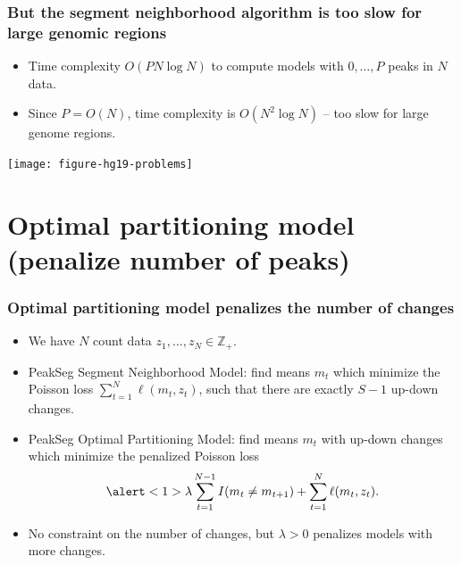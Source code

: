 \documentclass{beamer}
\newcommand{\ZZ}{\mathbb Z}
\begin{document}
\begin{frame}
  \frametitle{But the segment neighborhood algorithm is too slow for
    large genomic regions}
  \begin{itemize}
  \item Time complexity $O(P N \log N)$ to compute models with
    $0,\dots,P$ peaks in $N$ data.
  \item Since $P=O(N)$, time complexity is $O(N^2 \log N)$ -- too slow
    for large genome regions.
  \end{itemize}
  \texttt{[image: figure-hg19-problems]}
\end{frame}

\section{Optimal partitioning model (penalize number of peaks)}

\begin{frame}
  \frametitle{Optimal partitioning model penalizes the number of changes}
  \begin{itemize}
  \item We have $N$ count data $z_1, \dots, z_N\in\ZZ_+$.
  \item PeakSeg Segment Neighborhood Model: find means $m_t$ which
    minimize the Poisson loss $\sum_{t=1}^N \ell(m_t, z_t)$,
    such that there are exactly $S-1$ up-down changes.
  \item PeakSeg Optimal Partitioning Model: find means $m_t$ with
    up-down changes which minimize the \alert<1>{penalized} Poisson
    loss
    $$\alert<1>{\lambda\sum_{t=1}^{N-1}I(m_t\neq m_{t+1})} + \sum_{t=1}^N \ell(m_t, z_t).$$
  \item No constraint on the number of changes, but $\lambda > 0$
    penalizes models with more changes.
  \end{itemize}
\end{frame}
\end{document}
